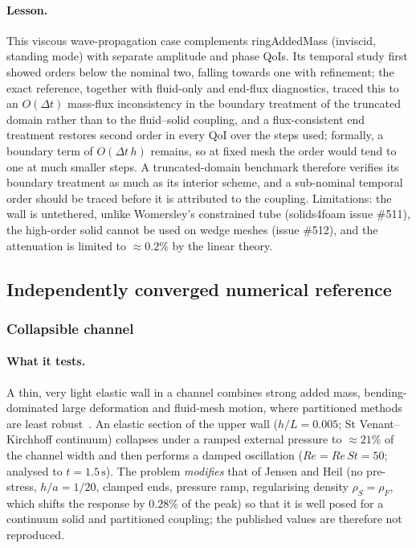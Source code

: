 \paragraph{Lesson.}
This viscous wave-propagation case complements ringAddedMass (inviscid, standing mode) with separate amplitude and phase QoIs.
Its temporal study first showed orders below the nominal two, falling towards one with refinement; the exact reference, together with fluid-only and end-flux diagnostics, traced this to an $O(\Delta t)$ mass-flux inconsistency in the boundary treatment of the truncated domain rather than to the fluid--solid coupling, and a flux-consistent end treatment restores second order in every QoI over the steps used; formally, a boundary term of $O(\Delta t\,h)$ remains, so at fixed mesh the order would tend to one at much smaller steps.
A truncated-domain benchmark therefore verifies its boundary treatment as much as its interior scheme, and a sub-nominal temporal order should be traced before it is attributed to the coupling.
Limitations: the wall is untethered, unlike Womersley's constrained tube (solids4foam issue \#511), the high-order solid cannot be used on wedge meshes (issue \#512), and the attenuation is limited to $\approx0.2\%$ by the linear theory.


\subsection{Independently converged numerical reference}\label{sec:independent_refs}

\subsubsection{Collapsible channel}\label{sec:collapsible}

\paragraph{What it tests.}
A thin, very light elastic wall in a channel combines strong added mass, bending-dominated large deformation and fluid-mesh motion, where partitioned methods are least robust~\citep{Jensen2003, Heil2004, Heil2008}.
An elastic section of the upper wall ($h/L = 0.005$; St Venant--Kirchhoff continuum) collapses under a ramped external pressure to $\approx21\%$ of the channel width and then performs a damped oscillation ($Re = Re\,St = 50$; analysed to $t = 1.5\,\mathrm{s}$).
The problem \emph{modifies} that of Jensen and Heil (no pre-stress, $h/a = 1/20$, clamped ends, pressure ramp, regularising density $\rho_S = \rho_F$, which shifts the response by $0.28\%$ of the peak) so that it is well posed for a continuum solid and partitioned coupling; the published values are therefore not reproduced.

